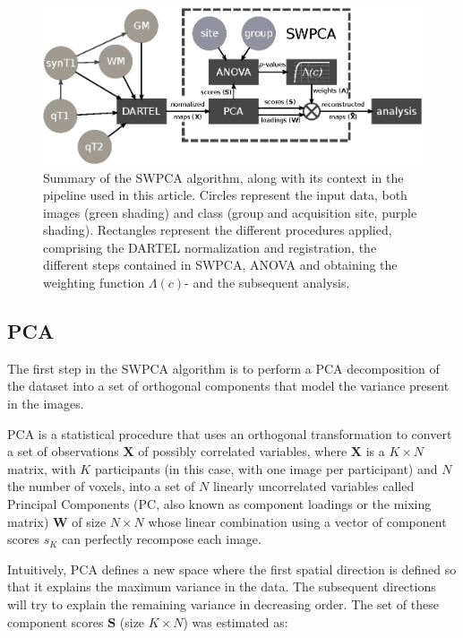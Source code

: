 \begin{figure}
\centering
\includegraphics[width=\linewidth]{Graphics/ch7/FIGURE01}
\caption[Summary of the \acs{SWPCA} algorithm, along with its context in the pipeline used in this article.]{Summary of the \ac{SWPCA} algorithm, along with its context in the pipeline used in this article. Circles represent the input data, both images (green shading) and class (group and acquisition site, purple shading). Rectangles represent the different procedures applied, comprising the DARTEL normalization and registration, the different steps contained in \ac{SWPCA}, \ac{ANOVA} and obtaining the weighting function $\Lambda(c)$- and the subsequent analysis.}
\label{fig:swpcaschema}
\end{figure}


\subsection{\acf{PCA}}\label{sec:pca}
The first step in the \ac{SWPCA} algorithm is to perform a \ac{PCA} decomposition
of the dataset into a set of orthogonal components that model the
variance present in the images. 

\ac{PCA} is a statistical procedure that uses an orthogonal transformation to convert a set of observations $\mathbf{X}$ of possibly correlated variables, where $\mathbf{X}$ is a $K\times N$ matrix, with $K$ participants (in this case, with one image per participant) and $N$ the number of voxels, into a set of $N$ linearly uncorrelated variables called Principal Components (PC, also known as component loadings or the mixing matrix)  $\mathbf{W}$ of size $N\times N$ whose linear combination using a vector of component scores  ${s}_{K}$ can perfectly recompose each image. 

Intuitively, \ac{PCA} defines a new space where the first spatial direction is defined so that it explains the maximum variance in the data. The subsequent directions will try to explain the remaining variance in decreasing order. The set of these component scores  $\mathbf{S}$ (size $K \times N$) was estimated as:

